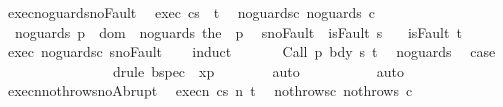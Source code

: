 \begin{isabellebody}
\isanewline
{}\isamarkupfalse%
\ exec{\isacharunderscore}noguards{\isacharunderscore}no{\isacharunderscore}Fault{\isacharcolon}\isanewline
\ \ exec{\isacharcolon}\ {\isachardoublequoteopen}{\isasymGamma}{\isasymturnstile}{\isasymlangle}c{\isacharcomma}s{\isasymrangle}\ {\isasymRightarrow}\ t{\isachardoublequoteclose}\isanewline
\ \ noguards{\isacharunderscore}c{\isacharcolon}\ {\isachardoublequoteopen}noguards\ c{\isachardoublequoteclose}\isanewline
\ \ noguards{\isacharunderscore}{\isasymGamma}{\isacharcolon}\ {\isachardoublequoteopen}{\isasymforall}p\ {\isasymin}\ dom\ {\isasymGamma}{\isachardot}\ noguards\ {\isacharparenleft}the\ {\isacharparenleft}{\isasymGamma}\ p{\isacharparenright}{\isacharparenright}{\isachardoublequoteclose}\isanewline
\ \ s{\isacharunderscore}no{\isacharunderscore}Fault{\isacharcolon}\ {\isachardoublequoteopen}{\isasymnot}\ isFault\ s{\isachardoublequoteclose}\isanewline
\ \ {\isachardoublequoteopen}{\isasymnot}\ isFault\ t{\isachardoublequoteclose}\isanewline
%
\isadelimproof
\ \ %
\endisadelimproof
%
\isatagproof
{}\isamarkupfalse%
\ exec\ noguards{\isacharunderscore}c\ s{\isacharunderscore}no{\isacharunderscore}Fault\isanewline
\ \ \isamarkupfalse%
\ {\isacharparenleft}induct{\isacharparenright}\ \isanewline
\ \ \ \ \isamarkupfalse%
\ {\isacharparenleft}Call\ p\ bdy\ s\ t{\isacharparenright}\ \isamarkupfalse%
\ noguards{\isacharunderscore}{\isasymGamma}\ \isamarkupfalse%
\ {\isacharquery}case\isanewline
\ \ \ \ \ \ \isamarkupfalse%
\ {\isacharminus}\isanewline
\ \ \ \ \ \ \isamarkupfalse%
\ {\isacharparenleft}drule\ bspec\ {\isacharbrackleft}\ x{\isacharequal}p{\isacharbrackright}{\isacharparenright}\isanewline
\ \ \ \ \ \ \isamarkupfalse%
\ auto\isanewline
\ \ \ \ \ \ \isamarkupfalse%
\isanewline
\ \ \isamarkupfalse%
\ auto%
\endisatagproof
{\isafoldproof}%
%
\isadelimproof
\isanewline
%
\endisadelimproof
\ \ \ \ \isanewline
{}\isamarkupfalse%
\ execn{\isacharunderscore}nothrows{\isacharunderscore}no{\isacharunderscore}Abrupt{\isacharcolon}\isanewline
\ \ execn{\isacharcolon}\ {\isachardoublequoteopen}{\isasymGamma}{\isasymturnstile}{\isasymlangle}c{\isacharcomma}s{\isasymrangle}\ {\isacharequal}n{\isasymRightarrow}\ t{\isachardoublequoteclose}\isanewline
\ \ nothrows{\isacharunderscore}c{\isacharcolon}\ {\isachardoublequoteopen}nothrows\ c{\isachardoublequoteclose}\isanewline

\end{isabellebody}
